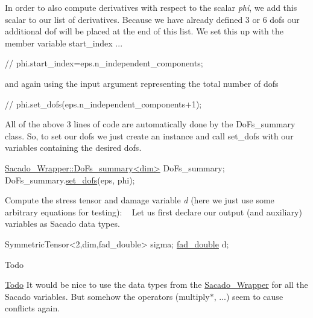 In order to also compute derivatives with respect to the scalar {\itshape phi}, we add this scalar to our list of derivatives. Because we have already defined 3 or 6 dofs our additional dof will be placed at the end of this list. We set this up with the member variable start\+\_\+index ... 
\begin{DoxyCode}
\textcolor{comment}{//    phi.start\_index=eps.n\_independent\_components;}
\end{DoxyCode}
 and again using the input argument representing the total number of dofs 
\begin{DoxyCode}
\textcolor{comment}{//    phi.set\_dofs(eps.n\_independent\_components+1);}
\end{DoxyCode}
 All of the above 3 lines of code are automatically done by the Do\+Fs\+\_\+summary class. So, to set our dofs we just create an instance and call set\+\_\+dofs with our variables containing the desired dofs. 
\begin{DoxyCode}
\hyperlink{classSacado__Wrapper_1_1DoFs__summary}{Sacado\_Wrapper::DoFs\_summary<dim>} DoFs\_summary;
DoFs\_summary.\hyperlink{classSacado__Wrapper_1_1DoFs__summary_a556293f6e683cb30151d9faadc2cc90d}{set\_dofs}(eps, phi);
\end{DoxyCode}
 Compute the stress tensor and damage variable {\itshape d} (here we just use some arbitrary equations for testing)\+: ~\newline
Let us first declare our output (and auxiliary) variables as Sacado data types. 
\begin{DoxyCode}
SymmetricTensor<2,dim,fad\_double> sigma;
\hyperlink{Sacado__example_8cc_a868b94676739e612d9c95940e70892a9}{fad\_double} d;
\end{DoxyCode}
 \begin{DoxyRefDesc}{Todo}
\item[\hyperlink{todo__todo000006}{Todo}]It would be nice to use the data types from the \hyperlink{namespaceSacado__Wrapper}{Sacado\+\_\+\+Wrapper} for all the Sacado variables. But somehow the operators (multiply$\ast$, ...) seem to cause conflicts again.\end{DoxyRefDesc}


